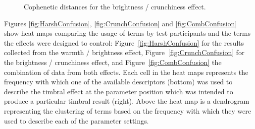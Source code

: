 			\begin{figure}[h!]
				\centering
				\quad
				\caption{Cophenetic distances for the brightness / crunchiness effect.}
				\label{fig:CrunchCophs}
			\end{figure}

			Figures \ref{fig:HarshConfusion}, \ref{fig:CrunchConfusion} and \ref{fig:CombConfusion} show heat
			maps comparing the usage of terms by test participants and the terms the effects were designed to
			control: Figure~\ref{fig:HarshConfusion} for the results collected from the warmth / brightness
			effect, Figure~\ref{fig:CrunchConfusion} for the brightness / crunchiness effect, and
			Figure~\ref{fig:CombConfusion} the combination of data from both effects. Each cell in the heat
			maps represents the frequency with which one of the available descriptors (bottom) was used to
			describe the timbral effect at the parameter position which was intended to produce a particular
			timbral result (right). Above the heat map is a dendrogram representing the clustering of terms
			based on the frequency with which they were used to describe each of the parameter settings.


